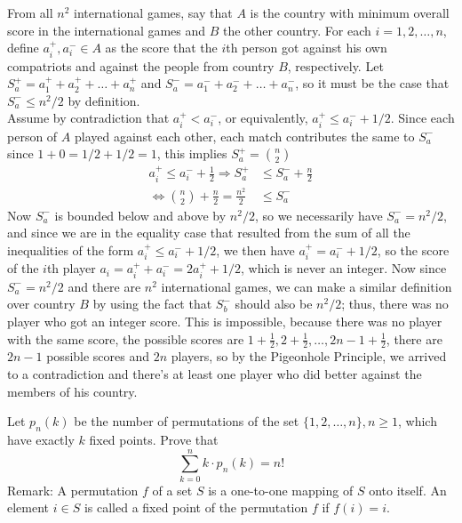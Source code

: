 \begin{solution}
    From all $n^2$ international games, say that $A$ is the country with minimum overall score in the international games and $B$ the other country. For each $i = 1,2, \ldots, n$, define $a_i^+, a_i^- \in A$ as the score that the $i$th person got against his own compatriots and against the people from country $B$, respectively. Let $S_a^+ = a_1^+ + a_2^+ + \ldots + a_n^+$ and $S_a^- = a_1^- + a_2^- + \ldots + a_n^-$, so it must be the case that $S_a^- \leq n^2/2$ by definition. \\[3mm]
    Assume by contradiction that $a_i^+ < a_i^-$, or equivalently, $a_i^+ \leq a_i^- + 1/2$. Since each person of $A$ played against each other, each match contributes the same to $S_a^-$ since $1 + 0 = 1/2 + 1/2 = 1$, this implies $S_a^+ = \binom{n}{2}$
    \begin{align*}
        a_i^+ \leq a_i^- + \frac{1}{2} 
        \Rightarrow S_a^+ &\leq S_a^- + \frac{n}{2} \\
        \iff \binom{n}{2} + \frac{n}{2} = \frac{n^2}{2} &\leq S_a^-
    \end{align*}
    Now $S_a^-$ is bounded below and above by $n^2/2$, so we necessarily have $S_a^- = n^2/2$, and since we are in the equality case that resulted from the sum of all the inequalities of the form $a_i^+ \leq a_i^- + 1/2$, we then have $a_i^+ = a_i^- + 1/2$, so the score of the $i$th player $a_i = a_i^+ + a_i^- = 2a_i^+ + 1/2$, which is never an integer. Now since $S_a^- = n^2/2$ and there are $n^2$ international games, we can make a similar definition over country $B$ by using the fact that $S_b^-$ should also be $n^2/2$; thus, there was no player who got an integer score. This is impossible, because there was no player with the same score, the possible scores are $1 + \frac{1}{2}, 2 + \frac{1}{2}, \ldots, 2n-1 + \frac{1}{2}$, there are $2n-1$ possible scores and $2n$ players, so by the Pigeonhole Principle, we arrived to a contradiction and there's at least one player who did better against the members of his country. 
\end{solution}

\begin{problem}[C][5][IMO 1987/1]
    Let $p_n(k)$ be the number of permutations of the set $\{ 1, 2 , \ldots, n \}, n \geq 1$, which have exactly $k$ fixed points. Prove that
    \vspace{-5pt}
    $$\sum_{k=0}^n k \cdot p_n(k) = n!$$
    Remark: A permutation $f$ of a set $S$ is a one-to-one mapping of $S$ onto itself. An element $i \in S$ is called a fixed point of the permutation $f$ if $f(i) = i$.
\end{problem}

